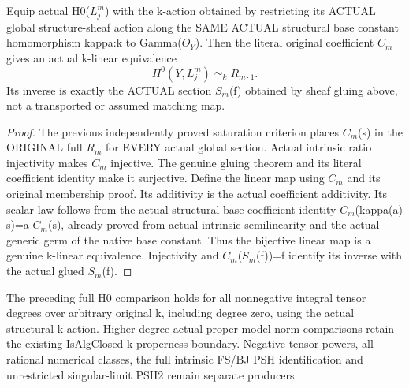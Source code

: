 \begin{theorem}
\label{thm:seven-native-original-tensor-h0-linear}
\leanok
Equip actual H0($L_j^m$) with the k-action obtained by restricting its ACTUAL
global structure-sheaf action along the SAME ACTUAL structural base
constant homomorphism kappa:k to Gamma($O_Y$). Then the literal original
coefficient $C_m$ gives an actual k-linear equivalence
\[
 H^0(Y,L_j^m) \simeq_k R_{m\cdot1}.
\]
Its inverse is exactly the ACTUAL section $S_m$(f) obtained by sheaf gluing
above, not a transported or assumed matching map.
\end{theorem}
\begin{proof}
The previous independently proved saturation criterion places $C_m$(s) in
the ORIGINAL full $R_m$ for EVERY actual global section. Actual intrinsic
ratio injectivity makes $C_m$ injective. The genuine gluing theorem and its
literal coefficient identity make it surjective. Define the linear map
using $C_m$ and its original membership proof. Its additivity is the actual
coefficient additivity. Its scalar law follows from the actual structural
base coefficient identity $C_m$(kappa(a) s)=a $C_m$(s), already proved from
actual intrinsic semilinearity and the actual generic germ of the native
base constant. Thus the bijective linear map is a genuine k-linear
equivalence. Injectivity and $C_m$($S_m$(f))=f identify its inverse with the
actual glued $S_m$(f).
\end{proof}


\begin{remark}
The preceding full H0 comparison holds for all nonnegative integral tensor
degrees over arbitrary original k, including degree zero, using the actual
structural k-action. Higher-degree actual proper-model norm comparisons
retain the existing IsAlgClosed k properness boundary. Negative tensor
powers, all rational numerical classes, the full intrinsic FS/BJ PSH
identification and unrestricted singular-limit PSH2 remain separate producers.
\end{remark}

